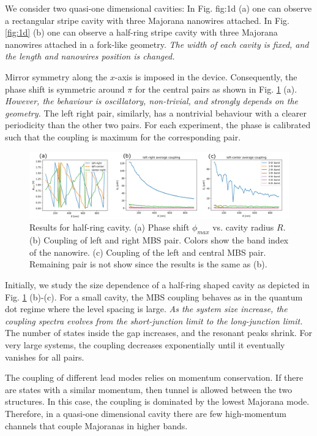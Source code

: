 We consider two quasi-one dimensional cavities:
In Fig. {fig:1d} (a) one can observe a rectangular stripe cavity with three Majorana nanowires attached. 
In Fig. \ref{fig:1d} (b) one can observe a half-ring stripe cavity with three Majorana nanowires attached in a fork-like geometry. 
\textit{The width of each cavity is fixed, and the length and nanowires position is changed.}

Mirror symmetry along the $x$-axis is imposed in the device.
Consequently, the phase shift is symmetric around $\pi$ for the central pairs as shown in Fig. \ref{fig:ring_results} (a).
\textit{However, the behaviour is oscillatory, non-trivial, and strongly depends on the geometry.}
The left right pair, similarly, has a nontrivial behaviour with a clearer periodicity than the other two pairs.
For each experiment, the phase is calibrated such that the coupling is maximum for the corresponding pair.

\begin{figure}[h!]
\centering
  \includegraphics[width=\linewidth]{figures/ring_results.pdf}
  \caption{Results for half-ring cavity. (a) Phase shift $\phi_{max}$ vs. cavity radius $R$. (b) Coupling of left and right MBS pair. Colors show the band index of the nanowire. (c) Coupling of the left and central MBS pair. Remaining pair is not show since the results is the same as (b).}
  \label{fig:ring_results}
\end{figure}

Initially, we study the size dependence of a half-ring shaped cavity as depicted in Fig. \ref{fig:ring_results} (b)-(c).
For a small cavity, the MBS coupling behaves as in the quantum dot regime where the level spacing is large.
\textit{As the system size increase, the coupling spectra evolves from the short-junction limit to the long-junction limit.}
The number of states inside the gap increases, and the resonant peaks shrink.
For very large systems, the coupling decreases exponentially until it eventually vanishes for all pairs.

The coupling of different lead modes relies on momentum conservation.
If there are states with a similar momentum, then tunnel is allowed between the two structures.
In this case, the coupling is dominated by the lowest Majorana mode.
Therefore, in a quasi-one dimensional cavity there are few high-momentum channels that couple Majoranas in higher bands.

